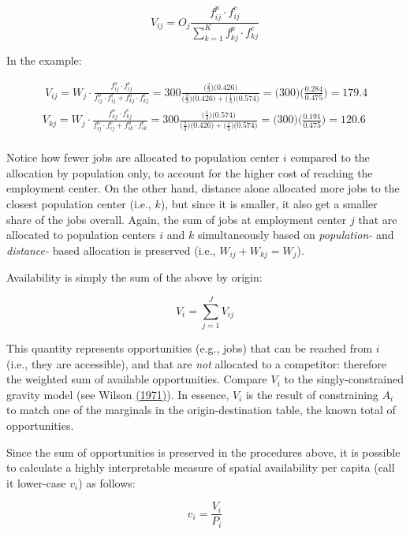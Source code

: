 \documentclass[]{elsarticle} %
\begin{document}
\[
V_{ij} = O_j\frac{f^p_{ij} \cdot f^c_{ij}}{\sum_{k=1}^K f^p_{kj} \cdot f^c_{kj}}
\]

In the example:

\[
\begin{array}{l}\
V_{ij} = W_j\cdot \frac{f^o_{ij} \cdot f^c_{ij}}{f^o_{ij} \cdot f^c_{ij} + f^o_{kj} \cdot f^c_{kj}} = 300 \frac{\big(\frac{2}{3} \big) \big(0.426 \big)}{\big(\frac{2}{3} \big) \big(0.426 \big) + \big(\frac{1}{3} \big) \big(0.574 \big)} = \big(300 \big)\big(\frac{0.284}{0.475} \big)= 179.4\\
V_{kj} = W_j\cdot \frac{f^o_{kj} \cdot f^c_{kj}}{f^o_{ij} \cdot f^c_{ij} + f^o_{ik} \cdot f^c_{ik}} = 300 \frac{\big(\frac{1}{3} \big) \big(0.574 \big)}{\big(\frac{2}{3} \big) \big(0.426 \big) + \big(\frac{1}{3} \big) \big(0.574 \big)}  = \big(300 \big)\big(\frac{0.191}{0.475} \big)= 120.6 \\
\end{array}
\]

Notice how fewer jobs are allocated to population center \(i\) compared
to the allocation by population only, to account for the higher cost of
reaching the employment center. On the other hand, distance alone
allocated more jobs to the closest population center (i.e., \(k\)), but
since it is smaller, it also get a smaller share of the jobs overall.
Again, the sum of jobs at employment center \(j\) that are allocated to
population centers \(i\) and \(k\) simultaneously based on
\emph{population-} and \emph{distance-} based allocation is preserved
(i.e., \(W_{ij} + W_{kj} = W_j\)).

Availability is simply the sum of the above by origin:

\[
V_i = \sum_{j=1}^J V_{ij}
\]

This quantity represents opportunities (e.g., jobs) that can be reached
from \(i\) (i.e., they are accessible), and that are \emph{not}
allocated to a competitor: therefore the weighted sum of available
opportunities. Compare \(V_i\) to the singly-constrained gravity model
(see Wilson \href{https://doi.org/10.1068/a030001}{(1971)}). In essence,
\(V_i\) is the result of constraining \(A_i\) to match one of the
marginals in the origin-destination table, the known total of
opportunities.

Since the sum of opportunities is preserved in the procedures above, it
is possible to calculate a highly interpretable measure of spatial
availability per capita (call it lower-case \(v_i\)) as follows:

\[
v_i = \frac{V_i}{P_i}
\]
\end{document}
